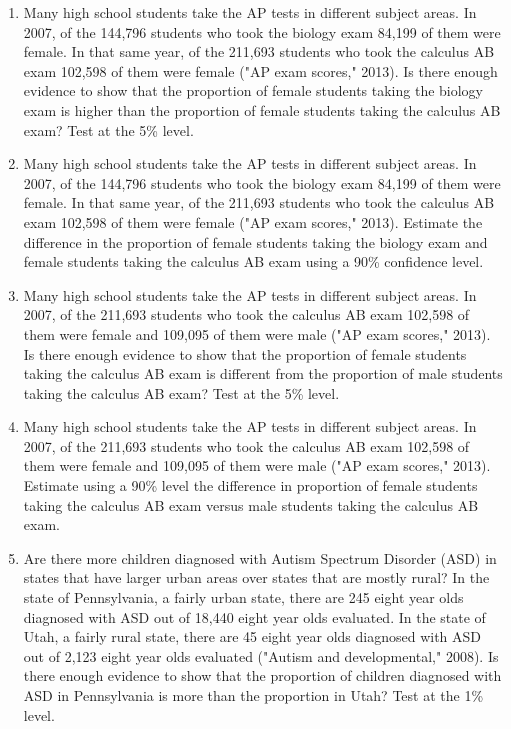 \documentclass[]{book}
\begin{document}
\begin{enumerate}
\def\labelenumi{\arabic{enumi}.}
\item
  Many high school students take the AP tests in different subject areas. In 2007, of the 144,796 students who took the biology exam 84,199 of them were female. In that same year, of the 211,693 students who took the calculus AB exam 102,598 of them were female ("AP exam scores," 2013). Is there enough evidence to show that the proportion of female students taking the biology exam is higher than the proportion of female students taking the calculus AB exam? Test at the 5\% level.
\item
  Many high school students take the AP tests in different subject areas. In 2007, of the 144,796 students who took the biology exam 84,199 of them were female. In that same year, of the 211,693 students who took the calculus AB exam 102,598 of them were female ("AP exam scores," 2013). Estimate the difference in the proportion of female students taking the biology exam and female students taking the calculus AB exam using a 90\% confidence level.
\item
  Many high school students take the AP tests in different subject areas. In 2007, of the 211,693 students who took the calculus AB exam 102,598 of them were female and 109,095 of them were male ("AP exam scores," 2013). Is there enough evidence to show that the proportion of female students taking the calculus AB exam is different from the proportion of male students taking the calculus AB exam? Test at the 5\% level.
\item
  Many high school students take the AP tests in different subject areas. In 2007, of the 211,693 students who took the calculus AB exam 102,598 of them were female and 109,095 of them were male ("AP exam scores," 2013). Estimate using a 90\% level the difference in proportion of female students taking the calculus AB exam versus male students taking the calculus AB exam.
\item
  Are there more children diagnosed with Autism Spectrum Disorder (ASD) in states that have larger urban areas over states that are mostly rural? In the state of Pennsylvania, a fairly urban state, there are 245 eight year olds diagnosed with ASD out of 18,440 eight year olds evaluated. In the state of Utah, a fairly rural state, there are 45 eight year olds diagnosed with ASD out of 2,123 eight year olds evaluated ("Autism and developmental," 2008). Is there enough evidence to show that the proportion of children diagnosed with ASD in Pennsylvania is more than the proportion in Utah? Test at the 1\% level.

\end{enumerate}
\end{document}
